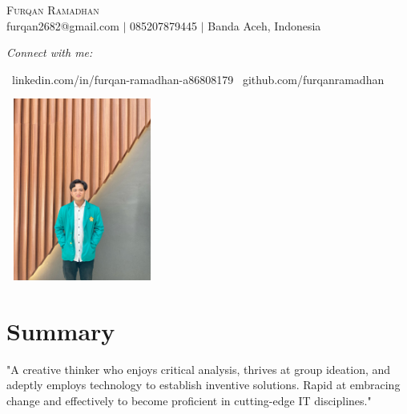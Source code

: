 \documentclass[letterpaper,10pt]{article}
\begin{document}
\hypersetup{
    linkcolor=blue,
    urlcolor=blue,
    linkbordercolor=blue,
    citebordercolor=blue
}

\begin{center}
  {\huge\scshape Furqan Ramadhan} \\ \vspace{5pt}
  furqan2682@gmail.com $|$ 085207879445 $|$ Banda Aceh, Indonesia \\
  \vspace{10pt}
  \begin{minipage}{0.4\textwidth}
    \centering
    \textit{Connect with me:} \\
    \vspace{5pt}
    \begin{minipage}{0.6\textwidth}
    \raggedright
    \hbox{\href{https://www.linkedin.com/in/furqan-ramadhan-a86808179}{\color{blue}\faLinkedin}~linkedin.com/in/furqan-ramadhan-a86808179}
    \href{https://github.com/furqanramadhan}{\color{black}\faGithub}~github.com/furqanramadhan
    \end{minipage}

  \end{minipage}%
  \begin{minipage}[r]{0.5\textwidth}
    \raggedleft
    \includegraphics[width=5cm, height=6cm]{public/img/img_01.jpeg}
  \end{minipage}

\end{center}

\section{Summary}

"A creative thinker who enjoys critical analysis, thrives at group ideation, and adeptly employs technology to establish inventive solutions. Rapid at embracing change and effectively to become proficient in cutting-edge IT disciplines."
\end{document}
